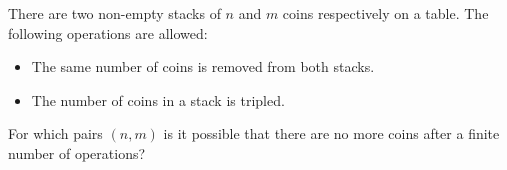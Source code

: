There are two non-empty stacks of $n$ and $m$ coins respectively on a table.
The following operations are allowed:
\begin{itemize}
    \item The same number of coins is removed from both stacks.
    \item The number of coins in a stack is tripled.
\end{itemize}
For which pairs $(n,m)$ is it possible that there are no more coins after a finite number of operations?
